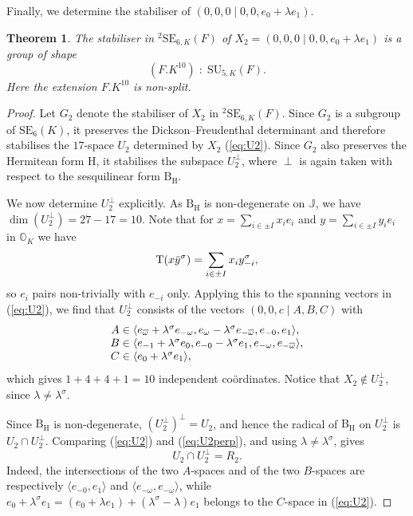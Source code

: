 \documentclass{amsart}
\def\ovy{\mathord{\mbox{\hspace*{0pt}}\,\overline{\!y\!\!\;}\!\:}\mbox{\hspace*{0pt}}}
\def\cn{\mathord{{\;\!{:}\;\!}}}
\def\OO{\mathord{\mathbb{O}}}
\newcommand{\SU}{\mathrm{SU}}
\newcommand{\SE}{\mathrm{SE}}
\newcommand{\Tr}{\operatorname{T}}
\newcommand{\J}{\mathbb{J}}
\renewcommand{\bar}{\overline}
\newcommand{\B}{\mathrm{B}}
\renewcommand{\H}{\mathrm{H}}
\newcommand{\s}{\sigma}
\theoremstyle{plain}
\newtheorem{theorem}{Theorem}
\numberwithin{theorem}{section}
\theoremstyle{definition}
\begin{document}
Finally, we determine the stabiliser of $(0,0,0\mid 0,0,e_0 + \lambda e_1)$. 
\begin{theorem}
	\label{theorem:7_type2_stabiliser}
	The stabiliser in ${}^2\SE_{6,K}(F)$ of
	$X_2 = (0,0,0\mid 0,0,e_0 + \lambda e_1)$ is a group of shape
	\begin{equation}
		(F.K^{10})\cn\SU_{5,K}(F).
	\end{equation}
	Here the extension $F.K^{10}$ is non-split.
\end{theorem}

\begin{proof}
	Let $G_2$ denote the stabiliser of $X_2$ in ${}^2\SE_{6,K}(F)$. Since $G_2$ is a subgroup of $\SE_6(K)$,
	it preserves the Dickson--Freudenthal determinant and therefore stabilises the $17$-space $U_2$ determined
	by $X_2$ (\ref{eq:U2}). Since $G_2$ also preserves the Hermitean form $\H$, it stabilises the subspace
	$U_2^{\perp}$, where $\perp$ is again taken with respect to the sesquilinear form $\B_{\H}$.

	We now determine $U_2^{\perp}$ explicitly. As $\B_{\H}$ is non-degenerate on $\J$, we have
	$\dim(U_2^{\perp}) = 27 - 17 = 10$. Note that for $x = \sum_{i\in\pm I} x_i e_i$ and
	$y = \sum_{i\in\pm I} y_i e_i$ in $\OO_K$ we have
	\begin{equation}
		\Tr(x\ovy^{\s}) = \sum_{i\in\pm I} x_i y_{-i}^{\s},
	\end{equation}
	so $e_i$ pairs non-trivially with $e_{-i}$ only.  Applying this to the
	spanning vectors in (\ref{eq:U2}), we find that $U_2^{\perp}$ consists of
	the vectors $(0,0,c\mid A,B,C)$ with
	\begin{equation}
		\label{eq:U2perp}
		\begin{array}{r@{\;}c@{\;}l}
			A & \in & \langle e_{\bar{\omega}}+\lambda^{\s} e_{-\omega},
			e_{\omega}-\lambda^{\s} e_{-\bar{\omega}}, e_{-0}, e_1 \rangle, \\
			B & \in & \langle e_{-1}+\lambda^{\s} e_0, e_{-0} - \lambda^{\s} e_1,
			e_{-\omega}, e_{-\bar{\omega}} \rangle, \\
			C & \in & \langle e_0 + \lambda^{\s} e_1 \rangle,
		\end{array}
	\end{equation}
	which gives $1+4+4+1=10$ independent co\"{o}rdinates.  Notice that
	$X_2\notin U_2^{\perp}$, since $\lambda\neq\lambda^{\s}$.

	Since $\B_{\H}$ is non-degenerate, $(U_2^{\perp})^{\perp}=U_2$, and hence the radical
	of $\B_{\H}$ on $U_2^{\perp}$ is $U_2\cap U_2^{\perp}$. Comparing
	(\ref{eq:U2}) and (\ref{eq:U2perp}), and using $\lambda\neq\lambda^{\s}$, gives
	\begin{equation}
		U_2\cap U_2^{\perp}=R_2.
	\end{equation}
	Indeed, the intersections of the two $A$-spaces and of the two $B$-spaces are
	respectively $\langle e_{-0},e_1\rangle$ and
	$\langle e_{-\omega},e_{-\bar{\omega}}\rangle$, while
	$e_0+\lambda^{\s}e_1=(e_0+\lambda e_1)+(\lambda^{\s}-\lambda)e_1$ belongs to the
	$C$-space in (\ref{eq:U2}).


\end{proof}
\end{document}
